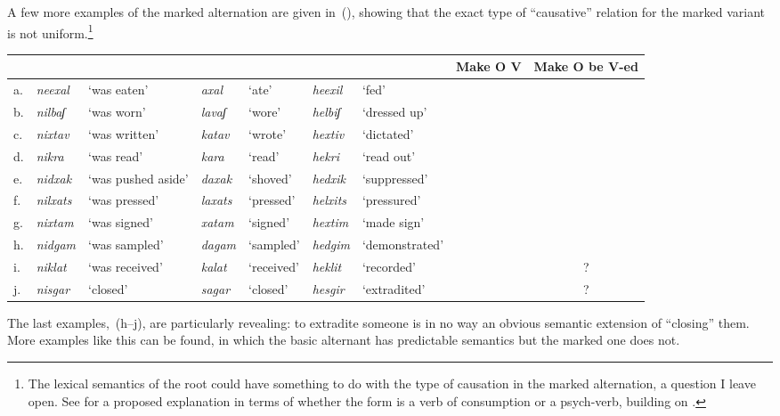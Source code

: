 A few more examples of the marked alternation are given in~(\nextx), showing that the exact type of ``causative'' relation for the marked variant is not uniform.\footnote{The lexical semantics of the root could have something to do with the type of causation in the marked alternation, a question I leave open. See \citet[44]{doron03} for a proposed explanation in terms of whether the {\tkal} form is a verb of consumption or a psych-verb, building on \cite{colesridhar77}.}
\ex\label{vd:ex:triplets-caus}
\xe
\begin{small}
\hspace{-4em}\begin{tabular}{l|ll|ll|llcc}
		\multicolumn{7}{c}{}		& Make O V	& Make O be V-ed\\\hline
		 a.& \emph{neexal}	& `was eaten'	& \emph{axal} & `ate'		& \emph{heexil} & `fed'			& \cmark	& \xmark\\
		 b.& \emph{nilbaʃ}	& `was worn'	& \emph{lavaʃ} & `wore' 	& \emph{helbiʃ}	&	`dressed up' 	& \cmark	& \xmark\\\hdashline
		 c.& \emph{nixtav} & `was written' & \emph{katav} & `wrote' & \emph{hextiv} & `dictated' & \xmark	& \cmark\\
		d.& \emph{nikra}	& `was read'	& \emph{kara} & `read'		& \emph{hekri}	& `read out'	& \xmark	& \cmark \\
		e.&	\emph{nidxak}	& `was pushed aside'	& \emph{daxak}	& `shoved'	& \emph{hedxik}	& `suppressed'\footnotemark	& \xmark	& \cmark\\
		f.& \emph{nilxats}	& `was pressed' &  \emph{laxats} & `pressed'	& \emph{helxits} & `pressured'	& \xmark	& \cmark \\\hdashline
		 g.& \emph{nixtam}	& `was signed'	& \emph{xatam} & `signed'	& \emph{hextim}	& `made sign'	& \cmark	& \cmark\\\hdashline
		h. & \emph{nidgam} & `was sampled'	& \emph{dagam} & `sampled'	& \emph{hedgim}		& `demonstrated'	& \xmark	& \xmark\\
		i. & \emph{niklat} & `was received' & \emph{kalat} & `received' & \emph{heklit} & `recorded' & \xmark & \cmark?\\
		j.& \emph{nisgar}	& `closed'	& \emph{sagar} & `closed'		& \emph{hesgir} & `extradited'	& \xmark	& \cmark?\\
		\end{tabular}
\end{small}

The last examples,~(\lastx h--j), are particularly revealing: to extradite someone is in no way an obvious semantic extension of ``closing'' them. More examples like this can be found, in which the basic alternant has predictable semantics but the marked one does not.

